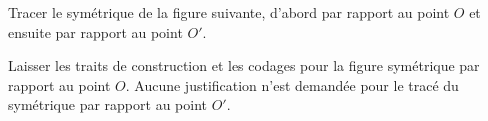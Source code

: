 
\begin{exercice}\label{exo2smath-0017}

    Tracer le symétrique de la figure suivante, d'abord par rapport au point \( O\) et ensuite par rapport au point \( O'\).

\begin{center}

\end{center}

    Laisser les traits de construction et les codages pour la figure symétrique par rapport au point \( O\). Aucune justification n'est demandée pour le tracé du symétrique par rapport au point \( O'\).

\end{exercice}
